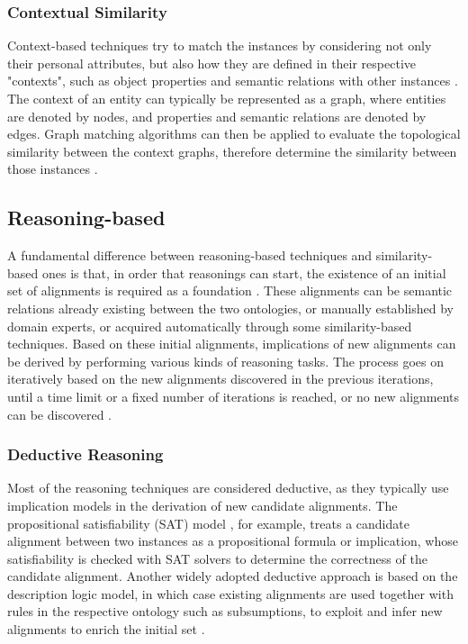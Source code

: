 \subsubsection{Contextual Similarity}

Context-based techniques try to match the instances by considering not only their personal attributes, but also how they are defined in their respective "contexts", such as object properties and semantic relations with other instances \cite{DBLP:journals/jucs/LinSX12}. The context of an entity can typically be represented as a graph, where entities are denoted by nodes, and properties and semantic relations are denoted by edges. Graph matching algorithms can then be applied to evaluate the topological similarity between the context graphs, therefore determine the similarity between those instances \cite{DBLP:conf/kdd/JehW02}.

\subsection{Reasoning-based}

A fundamental difference between reasoning-based techniques and similarity-based ones is that, in order that reasonings can start, the existence of an initial set of alignments is required as a foundation \cite{DBLP:conf/esws/Meilicke09}. These alignments can be semantic relations already existing between the two ontologies, or manually established by domain experts, or acquired automatically through some similarity-based techniques. Based on these initial alignments, implications of new alignments can be derived by performing various kinds of reasoning tasks. The process goes on iteratively based on the new alignments discovered in the previous iterations, until a time limit or a fixed number of iterations is reached, or no new alignments can be discovered \cite{DBLP:journals/logcom/MeilickeST09}.

\subsubsection{Deductive Reasoning}

Most of the reasoning techniques are considered deductive, as they typically use implication models in the derivation of new candidate alignments. The propositional satisfiability (SAT) model \cite{DBLP:journals/ai/PhamTS08}, for example, treats a candidate alignment between two instances as a propositional formula or implication, whose satisfiability is checked with SAT solvers to determine the correctness of the candidate alignment. Another widely adopted deductive approach is based on the description logic model, in which case existing alignments are used together with rules in the respective ontology such as subsumptions, to exploit and infer new alignments to enrich the initial set \cite{DBLP:phd/ethos/Reul12}.

